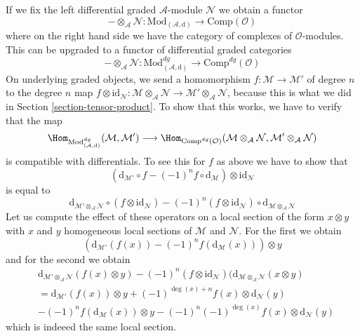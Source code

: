 \medskip\noindent
If we fix the left differential graded $\mathcal{A}$-module $\mathcal{N}$
we obtain a functor
$$
- \otimes_\mathcal{A} \mathcal{N} :
\text{Mod}_{(\mathcal{A}, \text{d})}
\longrightarrow
\text{Comp}(\mathcal{O})
$$
where on the right hand side we have the category of complexes of
$\mathcal{O}$-modules. This can be upgraded to a functor of
differential graded categories
$$
- \otimes_\mathcal{A} \mathcal{N} :
\text{Mod}^{dg}_{(\mathcal{A}, \text{d})}
\longrightarrow
\text{Comp}^{dg}(\mathcal{O})
$$
On underlying graded objects, we send
a homomorphism $f : \mathcal{M} \to \mathcal{M}'$ of degree $n$ 
to the degree $n$ map
$f \otimes \text{id}_\mathcal{N} :
\mathcal{M} \otimes_\mathcal{A} \mathcal{N} \to
\mathcal{M}' \otimes_\mathcal{A} \mathcal{N}$, because
this is what we did in Section \ref{section-tensor-product}.
To show that this works, we have to verify that the map
$$
\Hom_{\text{Mod}^{dg}_{(\mathcal{A}, \text{d})}}(\mathcal{M}, \mathcal{M}')
\longrightarrow
\Hom_{\text{Comp}^{dg}(\mathcal{O})}(
\mathcal{M} \otimes_\mathcal{A} \mathcal{N},
\mathcal{M}' \otimes_\mathcal{A} \mathcal{N})
$$
is compatible with differentials. To see this for $f$ as above
we have to show that
$$
(\text{d}_{\mathcal{M}'} \circ f - (-1)^n f \circ \text{d}_\mathcal{M})
\otimes \text{id}_\mathcal{N}
$$
is equal to
$$
\text{d}_{\mathcal{M}' \otimes_\mathcal{A} \mathcal{N}}
\circ (f \otimes \text{id}_\mathcal{N})
- (-1)^n (f \otimes \text{id}_\mathcal{N}) \circ
\text{d}_{\mathcal{M} \otimes_\mathcal{A} \mathcal{N}}
$$
Let us compute the effect of these operators on a local section
of the form $x \otimes y$ with $x$ and $y$ homogeneous local sections
of $\mathcal{M}$ and $\mathcal{N}$. For the first we obtain
$$
(\text{d}_{\mathcal{M}'}(f(x)) - (-1)^n f(\text{d}_\mathcal{M}(x))) \otimes y
$$
and for the second we obtain
\begin{align*}
&\text{d}_{\mathcal{M}' \otimes_\mathcal{A} \mathcal{N}}(f(x) \otimes y)
- (-1)^n (f \otimes \text{id}_\mathcal{N})(
\text{d}_{\mathcal{M} \otimes_\mathcal{A} \mathcal{N}}(x \otimes y) \\
& =
\text{d}_{\mathcal{M}'}(f(x)) \otimes y +
(-1)^{\deg(x) + n}f(x) \otimes \text{d}_\mathcal{N}(y) \\
&
-(-1)^n f(\text{d}_\mathcal{M}(x)) \otimes y
-(-1)^n (-1)^{\deg(x)}f(x) \otimes \text{d}_\mathcal{N}(y)
\end{align*}
which is indeeed the same local section.










